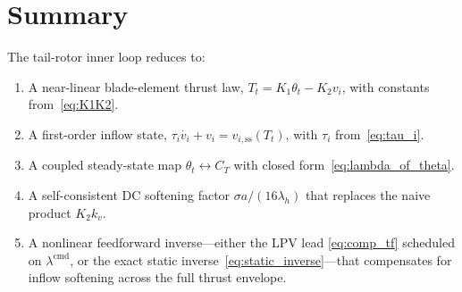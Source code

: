 \documentclass[11pt,a4paper]{article}
\newcommand{\Tt}{T_t}
\newcommand{\thetat}{\theta_t}
\newcommand{\vi}{v_i}
\newcommand{\viss}{v_{i,\text{ss}}}
\newcommand{\lcmd}{\lambda^{\text{cmd}}}
\begin{document}
\section{Summary}

The tail-rotor inner loop reduces to:

\begin{enumerate}[leftmargin=*]
\item A near-linear blade-element thrust law,
      \(\Tt = K_1\thetat - K_2\vi\), with constants from~\eqref{eq:K1K2}.
\item A first-order inflow state,
      \(\tau_i\dot{\vi}+\vi=\viss(\Tt)\), with \(\tau_i\) from~\eqref{eq:tau_i}.
\item A coupled steady-state map \(\thetat\leftrightarrow C_T\) with closed
      form~\eqref{eq:lambda_of_theta}.
\item A self-consistent DC softening factor \(\sigma a/(16\lambda_h)\) that
      replaces the naive product \(K_2 k_v\).
\item A nonlinear feedforward inverse---either the LPV lead
      \eqref{eq:comp_tf} scheduled on \(\lcmd\), or the exact static
      inverse~\eqref{eq:static_inverse}---that compensates for inflow
      softening across the full thrust envelope.
\end{enumerate}
\end{document}

